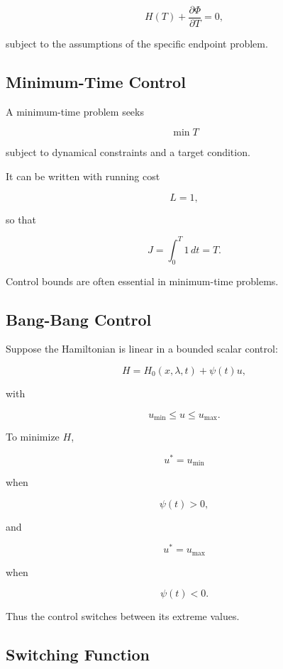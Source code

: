 \[
\boxed{
H(T)
+
\frac{\partial\Phi}{\partial T}
=
0,
}
\]

subject to the assumptions of the specific endpoint problem.

\subsection{Minimum-Time Control}
\label{subsec:minimum-time-control}

A minimum-time problem seeks

\[
\boxed{
\min T
}
\]

subject to dynamical constraints and a target condition.

It can be written with running cost

\[
\boxed{
L=1,
}
\]

so that

\[
\boxed{
J
=
\int_0^T1\,dt
=
T.
}
\]

Control bounds are often essential in minimum-time problems.

\subsection{Bang-Bang Control}
\label{subsec:bang-bang-control}

Suppose the Hamiltonian is linear in a bounded scalar control:

\[
\boxed{
H
=
H_0(x,\lambda,t)
+
\psi(t)u,
}
\]

with

\[
u_{\min}
\leq
u
\leq
u_{\max}.
\]

To minimize \(H\),

\[
\boxed{
u^*
=
u_{\min}
}
\]

when

\[
\psi(t)>0,
\]

and

\[
\boxed{
u^*
=
u_{\max}
}
\]

when

\[
\psi(t)<0.
\]

Thus the control switches between its extreme values.

\subsection{Switching Function}
\label{subsec:switching-function}

